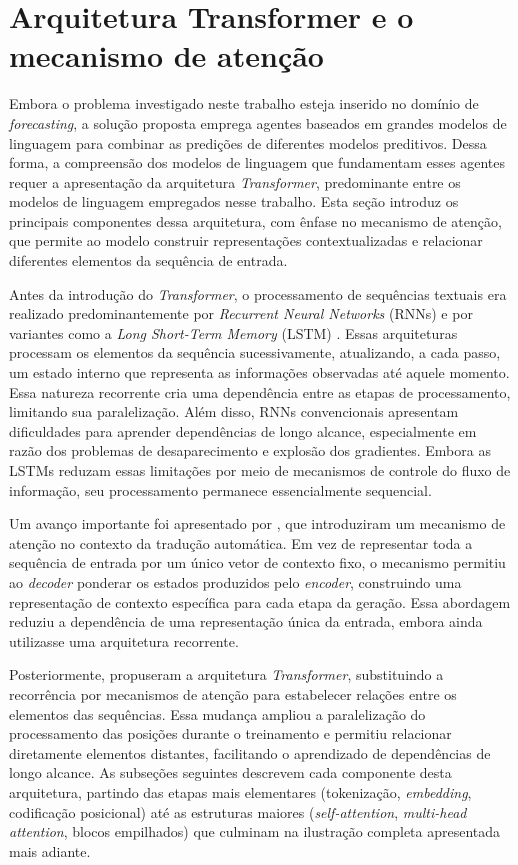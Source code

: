 \section{Arquitetura Transformer e o mecanismo de atenção}
\label{sec:llms-transformer}

Embora o problema investigado neste trabalho esteja inserido no domínio de \textit{forecasting}, a solução proposta emprega agentes baseados em grandes modelos de linguagem para combinar as predições de diferentes modelos preditivos. Dessa forma, a compreensão dos modelos de linguagem que fundamentam esses agentes requer a apresentação da arquitetura \textit{Transformer}, predominante entre os modelos de linguagem empregados nesse trabalho. Esta seção introduz os principais componentes dessa
arquitetura, com ênfase no mecanismo de atenção, que permite ao modelo
construir representações contextualizadas e relacionar diferentes elementos
da sequência de entrada.

Antes da introdução do \textit{Transformer}, o processamento de
sequências textuais era realizado predominantemente por \textit{Recurrent Neural
Networks} (RNNs) e por variantes como a \textit{Long Short-Term Memory} (LSTM)
\citep{hochreiter1997lstm}. Essas arquiteturas processam os elementos da
sequência sucessivamente, atualizando, a cada passo, um estado interno que
representa as informações observadas até aquele momento. Essa natureza
recorrente cria uma dependência entre as etapas de processamento, limitando
sua paralelização. Além disso, RNNs convencionais apresentam dificuldades para
aprender dependências de longo alcance, especialmente em razão dos problemas
de desaparecimento e explosão dos gradientes. Embora as LSTMs reduzam essas
limitações por meio de mecanismos de controle do fluxo de informação, seu
processamento permanece essencialmente sequencial.

Um avanço importante foi apresentado por \citet{bahdanau2014neural}, que introduziram um mecanismo de atenção no contexto da tradução automática. Em vez de representar toda a sequência de entrada por um único vetor de contexto fixo, o mecanismo permitiu ao \textit{decoder} ponderar os estados produzidos pelo \textit{encoder}, construindo uma representação de contexto específica para cada etapa da geração. Essa abordagem reduziu a dependência de uma representação única da entrada, embora ainda utilizasse uma arquitetura recorrente.

Posteriormente, \citet{vaswani2017attention} propuseram a arquitetura \textit{Transformer}, substituindo a recorrência por mecanismos de atenção para estabelecer relações entre os elementos das sequências. Essa mudança ampliou a paralelização do processamento das posições durante o treinamento e permitiu relacionar diretamente elementos distantes, facilitando o aprendizado de dependências de longo alcance. As subseções seguintes descrevem cada componente desta arquitetura, partindo das etapas mais elementares (tokenização, \textit{embedding}, codificação posicional) até as estruturas maiores (\textit{self-attention}, \textit{multi-head attention}, blocos empilhados) que culminam na ilustração completa apresentada mais adiante.

